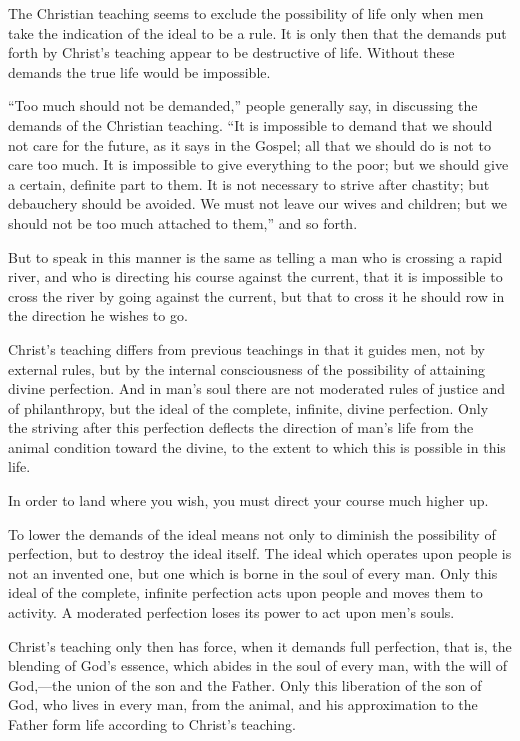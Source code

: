 \documentclass{book}
\begin{document}
The Christian teaching seems to exclude the possibility of life only when men take the indication of the ideal to be a rule. It is only then that the demands put forth by Christ’s teaching appear to be destructive of life. Without these demands the true life would be impossible.

“Too much should not be demanded,” people generally say, in discussing the demands of the Christian teaching. “It is impossible to demand that we should not care for the future, as it says in the Gospel; all that we should do is not to care too much. It is impossible to give everything to the poor; but we should give a certain, definite part to them. It is not necessary to strive after chastity; but debauchery should be avoided. We must not leave our wives and children; but we should not be too much attached to them,” and so forth.

But to speak in this manner is the same as telling a man who is crossing a rapid river, and who is directing his course against the current, that it is impossible to cross the river by going against the current, but that to cross it he should row in the direction he wishes to go.

Christ’s teaching differs from previous teachings in that it guides men, not by external rules, but by the internal consciousness of the possibility of attaining divine perfection. And in man’s soul there are not moderated rules of justice and of philanthropy, but the ideal of the complete, infinite, divine perfection. Only the striving after this perfection deflects the direction of man’s life from the animal condition toward the divine, to the extent to which this is possible in this life.

In order to land where you wish, you must direct your course much higher up.

To lower the demands of the ideal means not only to diminish the possibility of perfection, but to destroy the ideal itself. The ideal which operates upon people is not an invented one, but one which is borne in the soul of every man. Only this ideal of the complete, infinite perfection acts upon people and moves them to activity. A moderated perfection loses its power to act upon men’s souls.

Christ’s teaching only then has force, when it demands full perfection, that is, the blending of God’s essence, which abides in the soul of every man, with the will of God,—the union of the son and the Father. Only this liberation of the son of God, who lives in every man, from the animal, and his approximation to the Father form life according to Christ’s teaching.
\end{document}
